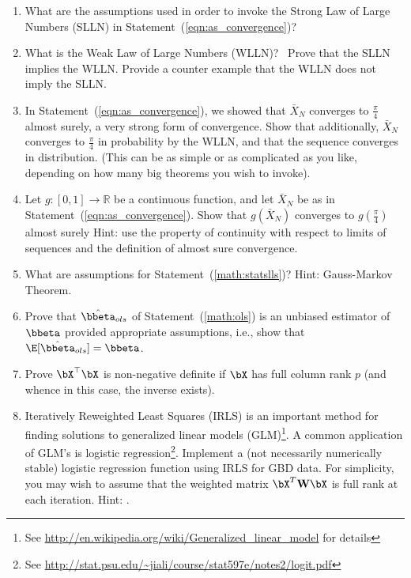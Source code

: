 \begin{enumerate}[label=\thechapter-\arabic*]
\item
What are the assumptions used in order to invoke the Strong Law of Large 
Numbers (SLLN) in Statement~(\ref{eqn:as_convergence})?

\item
What is the Weak Law of Large Numbers
(WLLN)?~
Prove that the SLLN implies the WLLN. Provide a counter example that the WLLN 
does not imply the SLLN.

\item
In Statement~(\ref{eqn:as_convergence}), we showed that $\bar{X}_N$ converges 
to $\frac{\pi}{4}$ almost surely,
a very strong form of convergence.  Show that 
additionally, $\bar{X}_N$ converges to $\frac{\pi}{4}$
in probability by the 
WLLN, and that the sequence converges
in distribution. (This can be as simple 
or as complicated as you like, depending on how many big theorems you wish to 
invoke).

\item
Let $g : [0, 1] \rightarrow  \mathbb{R}$ be a continuous function, and let 
$\bar{X}_N$ be as in Statement~(\ref{eqn:as_convergence}).  Show that 
$g(\bar{X}_N)$ converges to $g\left(\frac{\pi}{4}\right)$ almost surely
{\color{blue} Hint: 
use the property of continuity with respect to limits of sequences and the 
definition of almost sure convergence.}

\item
What are assumptions for Statement~(\ref{math:statslls})?
{\color{blue} Hint: Gauss-Markov Theorem.}

\item
Prove that $\hat{\bbeta}_{ols}$ of Statement~(\ref{math:ols}) is an unbiased
estimator of $\bbeta$ provided appropriate assumptions, i.e., show that
$\E[ \hat{\bbeta}_{ols} ] = \bbeta$.\label{ex:stat1}

\item
Prove $\bX^\top\bX$ is non-negative definite if $\bX$ has full column rank 
$p$ (and whence in this case, the inverse exists).

\item
Iteratively Reweighted Least Squares (IRLS) is an important method for finding 
solutions to generalized linear models (GLM)\footnote{See 
\url{http://en.wikipedia.org/wiki/Generalized_linear_model} for details}.  A 
common application of GLM's is logistic regression\footnote{See 
\url{http://stat.psu.edu/~jiali/course/stat597e/notes2/logit.pdf}}.
Implement a (not necessarily numerically stable) logistic regression function 
using IRLS for GBD data.  For simplicity, you may wish to assume that the 
weighted matrix $\bX^T\textbf{W}\bX$ is full rank at each iteration.
{\color{blue} Hint: \citet{McCullagh1989}.}
  
\end{enumerate}

